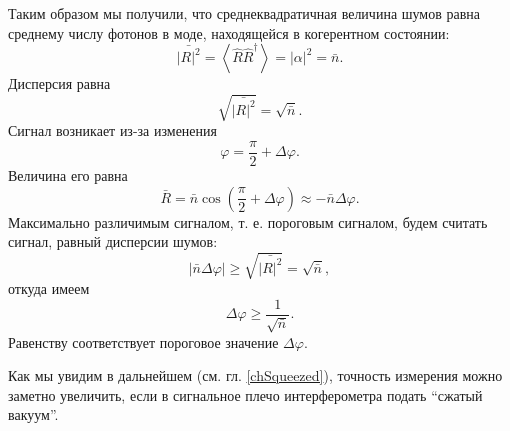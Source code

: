 Таким образом мы получили, что среднеквадратичная величина шумов равна
среднему числу фотонов в моде, находящейся в когерентном состоянии:
\begin{equation}
\bar{\left|R\right|^2} = 
\left<\hat{R}\hat{R}^{\dag}\right> = 
\left|\alpha\right|^2 =
\bar{n}.
\nonumber
\end{equation}
Дисперсия равна
\begin{equation}
\sqrt{\bar{\left|R\right|^2}} = 
\sqrt{\bar{n}}.
\nonumber
\end{equation}
Сигнал возникает из-за изменения 
\[
\varphi = \frac{\pi}{2} + \Delta \varphi.
\]
Величина его равна
\[
\bar{R} = \bar{n} \cos\left(\frac{\pi}{2} + \Delta \varphi\right) \approx
- \bar{n} \Delta \varphi.
\]
Максимально различимым сигналом, т. е. пороговым сигналом, будем
считать сигнал, равный дисперсии шумов:
\[
\left|\bar{n} \Delta \varphi\right| \ge
\sqrt{\bar{\left|R\right|^2}} = 
\sqrt{\bar{n}},
\]
откуда имеем
\[
\Delta \varphi  \ge \frac{1}{\sqrt{\bar{n}}}.
\]
Равенству соответствует пороговое значение $\Delta \varphi$.

Как мы увидим в дальнейшем (см. гл. \ref{chSqueezed}), точность измерения
можно заметно увеличить, если в сигнальное плечо интерферометра подать
``сжатый вакуум''.  


